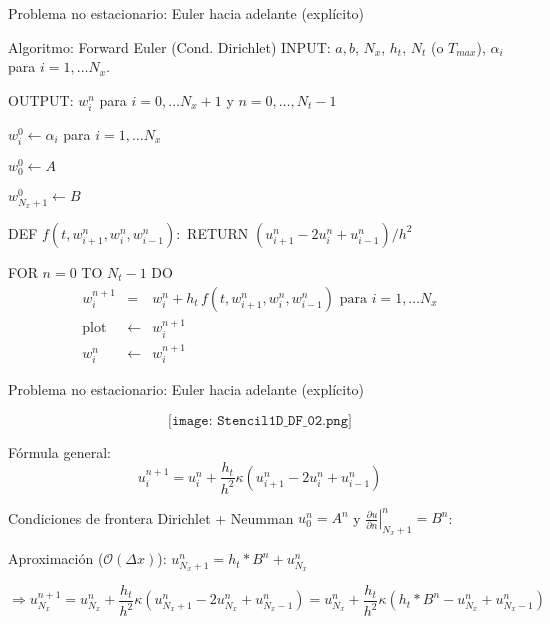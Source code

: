 \documentclass[handout]{beamer}
\begin{document}
\begin{frame}{Problema no estacionario: Euler hacia adelante (expl\'icito)}


\begin{footnotesize}

\begin{block}{Algoritmo: Forward Euler (Cond. Dirichlet)}
INPUT: $a,b$, $N_x$, $h_t$, $N_t$ (o $T_{max}$), $\alpha_i$ para $i=1,\dots N_x$.

OUTPUT: $w_i^n$ para $i=0,\dots N_x+1$ y $ n = 0, \dots, N_t-1$

$w_{i}^{0} \leftarrow \alpha_{i}$ para $i=1,\dots N_x$

$w_0^{0} \leftarrow A$

$w_{N_x+1}^0 \leftarrow B$

DEF $f(t, w_{i+1}^{n}, w_{i}^{n}, w_{i-1}^{n}) : $
  RETURN $\left(u_{i+1}^{n} - 2 u_{i}^{n} + u_{i-1}^{n}\right) / h^2$

FOR $ n = 0$ TO $N_t-1$ DO
\begin{eqnarray*}
w_{i}^{n+1} & = & w_{i}^{n} + h_t \, f(t, w_{i+1}^{n}, w_{i}^{n}, w_{i-1}^{n}) \text{ para } 
i=1,\dots N_x \\
\text{plot} & \leftarrow & w_i^{n+1} \\
w_{i}^{n} & \leftarrow & w_{i}^{n+1}
\end{eqnarray*}
\end{block}
\end{footnotesize}

\end{frame}

\begin{frame}{Problema no estacionario: Euler hacia adelante (expl\'icito)}
	
	$$\texttt{[image: Stencil1D\_DF\_02.png]}$$
	
	\begin{small}
		
		F\'ormula general:
		\begin{displaymath}
		u_{i}^{n+1} = u_{i}^{n} + \frac{h_t}{h^2} \kappa \left(u_{i+1}^{n} - 2 u_{i}^{n} + u_{i-1}^{n}\right)
		\end{displaymath}	
		
		
		Condiciones de frontera Dirichlet + Neumman $u_{0}^{n} = A^{n}$ y
		 $\displaystyle \left.\frac{\partial u}{\partial n}\right|_{N_x+1}^{n} = B^{n}$:
		 
		Aproximaci\'on ($\mathcal{O}(\Delta x)$): $u_{N_x+1}^{n} = h_t * B^n + u_{N_x}^{n}$
	\end{small}
			
		{\footnotesize $ \Rightarrow u_{N_x}^{n+1} = u_{N_x}^{n} + \dfrac{h_t}{h^2} \kappa \left(\boxed{u_{N_x+1}^{n}} - 2 u_{N_x}^{n} + u_{N_x-1}^{n}\right) = u_{N_x}^{n} + \dfrac{h_t}{h^2} \kappa \left(h_t * B^{n} - u_{N_x}^{n} +  u_{N_x-1}^{n} \right)$}

		

\end{frame}
\end{document}
